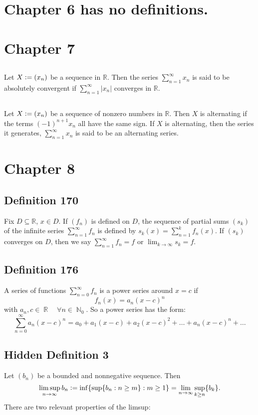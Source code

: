 \documentclass{article}
\DeclareMathOperator\R{\mathbb{R}}
\DeclareMathOperator\N{\mathbb{N}}
\begin{document}
\section*{Chapter 6 has no definitions.}
\section*{Chapter 7}
\subsection{}
Let $X \vcentcolon= (x_n)$ be a sequence in $\mathbb{R}$. Then the series
$\sum_{n=1}^{\infty}x_n$ is said to be absolutely convergent if $\sum_{n=1}^{\infty}|x_n|$ converges in
$\mathbb{R}$.
\subsection{}
Let $X \vcentcolon= (x_n)$ be a sequence of nonzero numbers in $\mathbb{R}$. Then $X$ is alternating if
the terms $(-1)^{n+1}x_n$ all have the same sign. If $X$ is alternating, then the series it generates,
$\sum_{n=1}^{\infty}x_n$ is said to be an alternating series.
\section*{Chapter 8}
\subsection{Definition 170}
Fix $D \subseteq \mathbb{R}$, $x \in D$. If $(f_n)$ is defined on $D$, the sequence of partial sums
$(s_k)$ of the infinite series $\sum_{n=1}^{\infty}f_n$ is defined by $s_k(x) = \sum_{n=1}^{k}f_n(x)$.
If $(s_k)$
converges on $D$,
then we say $\sum_{n=1}^{\infty}f_n
= f \text{ or } \lim_{k \to \infty}s_k = f$.
\subsection{Definition 176}
A series of functions $\sum_{n=0}^{\infty}f_n$ is a power series around
$x=c$ if $$f_n(x) = a_n (x-c)^n$$ with $a_n, c \in \R \quad \forall n \in \N_0$.
So a power series has the form: $$
\sum_{n=0}^{\infty} a_n(x-c)^n = a_0 + a_1(x-c)+a_2(x-c)^2+\hdots+a_n(x-c)^n+ \hdots
$$
\subsection{Hidden Definition 3}
Let $(b_n)$ be a bounded and nonnegative sequence. Then $$
\limsup_{n \to \infty}b_n \vcentcolon= \inf \{ \sup \{b_n: n \geq m\}:m \geq 1 \}
= \lim_{n \to \infty} \sup_{k \geq n} \{b_k \}.
$$
There are two relevant properties of the limsup:
\end{document}

